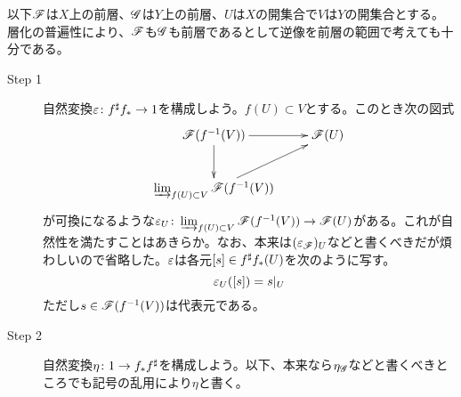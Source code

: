 以下$\mathscr{F}$は$X$上の前層、$\mathscr{G}$は$Y$上の前層、$U$は$X$の開集合で$V$は$Y$の開集合とする。層化の普遍性により、$\mathscr{F}$も$\mathscr{G}$も前層であるとして逆像を前層の範囲で考えても十分である。
\begin{description}
  \item[Step 1] 自然変換${\varepsilon} \colon f^{\sharp} f_* \to 1$を構成しよう。$f(U) \subset V$とする。このとき次の図式
  \[
  \xymatrix{
  \scrf(f^{-1}(V)) \ar[r] \ar[d] & \scrf(U) \\
  \rlim_{f(U) \subset V} \scrf(f^{-1}(V)) \ar[ru] &
  }
  \]
  が可換になるような${\varepsilon}_{U} \colon \operatorname*{\varinjlim}_{f(U) \subset V} \mathscr{F}(f^{-1}(V)) \to \mathscr{F}(U)$がある。これが自然性を満たすことはあきらか。なお、本来は$({\varepsilon}_{\mathscr{F}})_U$などと書くべきだが煩わしいので省略した。${\varepsilon}$は各元$[s] \in f^{\sharp} f_*(U)$を次のように写す。
  \[
  {\varepsilon}_U([s]) = s|_U
  \]
  ただし$s \in \mathscr{F}(f^{-1}(V))$は代表元である。
  \item[Step 2] 自然変換$\eta \colon 1 \to f_* f^{\sharp} $を構成しよう。以下、本来なら$\eta_{\mathscr{G}}$などと書くべきところでも記号の乱用により$\eta$と書く。


\end{description}
